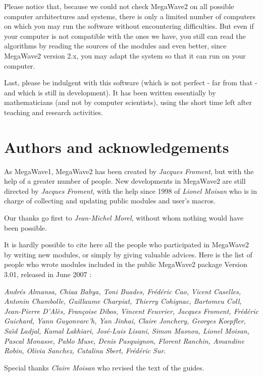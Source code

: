 Please notice that, because we could not check MegaWave2 on all possible computer architectures and systems, there is only 
a limited number of computers on which you may run the software without encountering difficulties. 
But even if your computer is not compatible with the ones we have, you still can read the algorithms by reading the sources of
the modules and even better, since MegaWave2 version 2.x, you may adapt the system so that it can run on your computer.

Last, please be indulgent with this software (which is not perfect - far from that - and which is still in development).
It has been written essentially by mathematicians (and not by computer scientists), using the short time left after 
teaching and research activities.

\section{Authors and acknowledgements}
\label{intro_authors}

As MegaWave1, MegaWave2 has been created by {\em Jacques Froment}, but with the help of a greater number of people.
New developments in MegaWave2 are still directed by {\em Jacques Froment}, with the help since 1998 of {\em Lionel Moisan}
who is in charge of collecting and updating public modules and user's macros. 

Our thanks go first to {\em Jean-Michel Morel}, without whom nothing would have been possible.

It is hardly possible to cite here all the people who participated in MegaWave2 by writing new modules, or 
simply by giving valuable advices. 
Here is the list of people who wrote modules included in the public MegaWave2 package Version 3.01, released in
June 2007 :

{\em 
Andr\'es Almansa,
Chiaa Babya,
Toni Buades,
Fr\'ed\'eric Cao,
Vicent Caselles,
Antonin Chambolle,
Guillaume Charpiat,
Thierry Cohignac,
Bartomeu Coll,
Jean-Pierre D'Al\`es,
Fran\c{c}oise Dibos,
Vincent Feuvrier,
Jacques Froment,
Fr\'ed\'eric Guichard,
Yann Guyonvarc'h,
Yan Jinhai,
Claire Jonchery,
Georges Koepfler,
Sa\"{\i}d Ladjal,
Kamal Lakhiari,
Jos\'e-Luis Lisani,
Simon Masnou,
Lionel Moisan,
Pascal Monasse,
Pablo Muse,
Denis Pasquignon,
Florent Ranchin,
Amandine Robin,
Olivia Sanchez,
Catalina Sbert,
Fr\'ed\'eric Sur.
}

Special thanks {\em Claire Moisan} who revised the text of the guides. 


